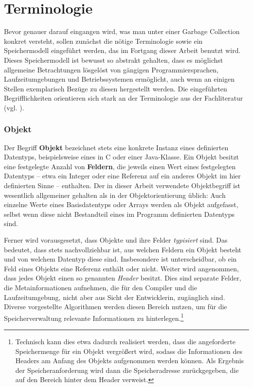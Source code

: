 \section{Terminologie}
\label{sec:intro:terminologie}
Bevor genauer darauf eingangen wird, was man unter einer Garbage Collection konkret versteht, sollen zunächst die nötige Terminologie sowie ein Speichermodell eingeführt werden, das im Fortgang dieser Arbeit benutzt wird.
Dieses Speichermodell ist bewusst so abstrakt gehalten, dass es möglichst allgemeine Betrachtungen lösgelöst von gängigen Programmiersprachen, Laufzeitumgebungen und Betriebssystemen ermöglicht, auch wenn an einigen Stellen exemplarisch Bezüge zu diesen hergestellt werden.
Die eingeführten Begrifflichkeiten orientieren sich stark an der Terminologie aus der Fachliteratur (vgl. \cite[Kap. 1]{jones-lins}).

\subsubsection*{Objekt}
Der Begriff \textbf{Objekt} bezeichnet stets eine konkrete Instanz eines definierten Datentyps, beispielsweise eines  in C oder einer Java-Klasse.
Ein Objekt besitzt eine festgelegte Anzahl von \textbf{Feldern}, die jeweils einen Wert eines festgelegten Datentyps -- etwa ein Integer oder eine Referenz auf ein anderes Objekt im hier definierten Sinne -- enthalten.
Der in dieser Arbeit verwendete Objektbegriff ist wesentlich allgemeiner gehalten als in der Objektorientierung üblich:
Auch einzelne Werte eines Basisdatentyps oder Arrays werden als Objekt aufgefasst, selbst wenn diese nicht Bestandteil eines im Programm definierten Datentyps sind.

Ferner wird vorausgesetzt, dass Objekte und ihre Felder \textit{typisiert} sind.
Das bedeutet, dass stets nachvollziehbar ist, aus welchen Feldern ein Objekt besteht und von welchem Datentyp diese sind.
Insbesondere ist unterscheidbar, ob ein Feld eines Objekts eine Referenz enthält oder nicht.
Weiter wird angenommen, dass jedes Objekt einen so genannten \textit{Header} besitzt.
Dies sind separate Felder, die Metainformationen aufnehmen, die für den Compiler und die Laufzeitumgebung, nicht aber aus Sicht der Entwicklerin, zugänglich sind.
Diverse vorgestellte Algorithmen werden diesen Bereich nutzen, um für die Speicherverwaltung relevante Informationen zu hinterlegen.\footnote{Technisch kann dies etwa dadurch realisiert werden, dass die angeforderte Speichermenge für ein Objekt vergrößert wird, sodass die Informationen des Headers am Anfang des Objekts aufgenommen werden können.
Als Ergebnis der Speicheranforderung wird dann die Speicheradresse zurückgegeben, die auf den Bereich hinter dem Header verweist.}

